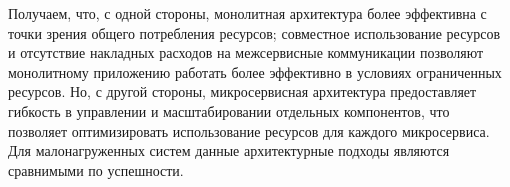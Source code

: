     Получаем, что, с одной стороны, монолитная архитектура более эффективна с точки зрения общего потребления ресурсов; совместное использование ресурсов и отсутствие накладных расходов на межсервисные коммуникации позволяют монолитному приложению работать более эффективно в условиях ограниченных ресурсов. Но, с другой стороны, микросервисная архитектура предоставляет гибкость в управлении и масштабировании отдельных компонентов, что позволяет оптимизировать использование ресурсов для каждого микросервиса. Для малонагруженных систем данные архитектурные подходы являются сравнимыми по успешности.
        
\clearpage